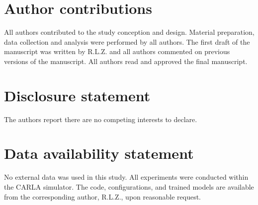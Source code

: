 \documentclass[]{interact}
\begin{document}
\section*{Author contributions}

All authors contributed to the study conception and design. Material preparation, data collection and analysis were performed by all authors. The first draft of the manuscript was written by R.L.Z. and all authors commented on previous versions of the manuscript. All authors read and approved the final manuscript.

\section*{Disclosure statement}
The authors report there are no competing interests to declare.

\section*{Data availability statement}
No external data was used in this study. All experiments were conducted within the CARLA simulator. The code, configurations, and trained models are available from the corresponding author, R.L.Z., upon reasonable request.



\end{document}
